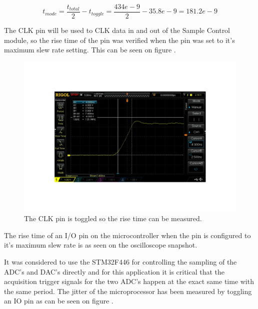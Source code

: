 \begin{equation}\label{eq:App_A_ModeSwitch}
    t_{mode} = \frac{t_{total}}{2} - t_{toggle} = \frac{434e-9}{2} - 35.8e-9 = 181.2e-9 
\end{equation}

The CLK pin will be used to CLK data in and out of the Sample Control module, so the rise time of the pin was verified when the pin was set to it's maximum slew rate setting. This can be seen on figure .

\begin{figure}[H]
    \centering
    \includegraphics[clip, trim=0 100 0 100, width=1\textwidth]{Appendix/Figures/IORiseFallTime.pdf}
    \caption{The CLK pin is toggled so the rise time can be measured.}
    \label{fig:App_A_RiseTime}
\end{figure}

The rise time of an I/O pin on the microcontroller when the pin is configured to it's maximum slew rate is  as seen on the oscilloscope snapshot. 

It was considered to use the STM32F446 for controlling the sampling of the ADC's and DAC's directly and for this application it is critical that the acquisition trigger signals for the two ADC's happen at the exact same time with the same period. The jitter of the microprocessor has been measured by toggling an IO pin as can be seen on figure .

